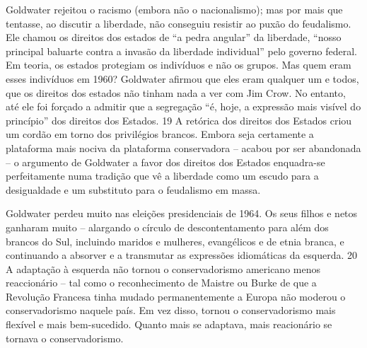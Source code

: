 Goldwater rejeitou o racismo (embora não o nacionalismo); mas por mais que tentasse, ao discutir a liberdade, não conseguiu resistir ao puxão do feudalismo. Ele chamou os direitos dos estados de “a pedra angular” da liberdade, “nosso principal baluarte contra a invasão da liberdade individual” pelo governo federal. Em teoria, os estados protegiam os indivíduos e não os grupos. Mas quem eram esses indivíduos em 1960? Goldwater afirmou que eles eram qualquer um e todos, que os direitos dos estados não tinham nada a ver com Jim Crow. No entanto, até ele foi forçado a admitir que a segregação “é, hoje, a expressão mais visível do princípio” dos direitos dos Estados. {\color{blue}19} A retórica dos direitos dos Estados criou um cordão em torno dos privilégios brancos. Embora seja certamente a plataforma mais nociva da plataforma conservadora – acabou por ser abandonada – o argumento de Goldwater a favor dos direitos dos Estados enquadra-se perfeitamente numa tradição que vê a liberdade como um escudo para a desigualdade e um substituto para o feudalismo em massa.
 \par 
Goldwater perdeu muito nas eleições presidenciais de 1964. Os seus filhos e netos ganharam muito – alargando o círculo de descontentamento para além dos brancos do Sul, incluindo maridos e mulheres, evangélicos e de etnia branca, e continuando a absorver e a transmutar as expressões idiomáticas da esquerda. {\color{blue}20} A adaptação à esquerda não tornou o conservadorismo americano menos reaccionário – tal como o reconhecimento de Maistre ou Burke de que a Revolução Francesa tinha mudado permanentemente a Europa não moderou o conservadorismo naquele país. Em vez disso, tornou o conservadorismo mais flexível e mais bem-sucedido. Quanto mais se adaptava, mais reacionário se tornava o conservadorismo.
 \par 
